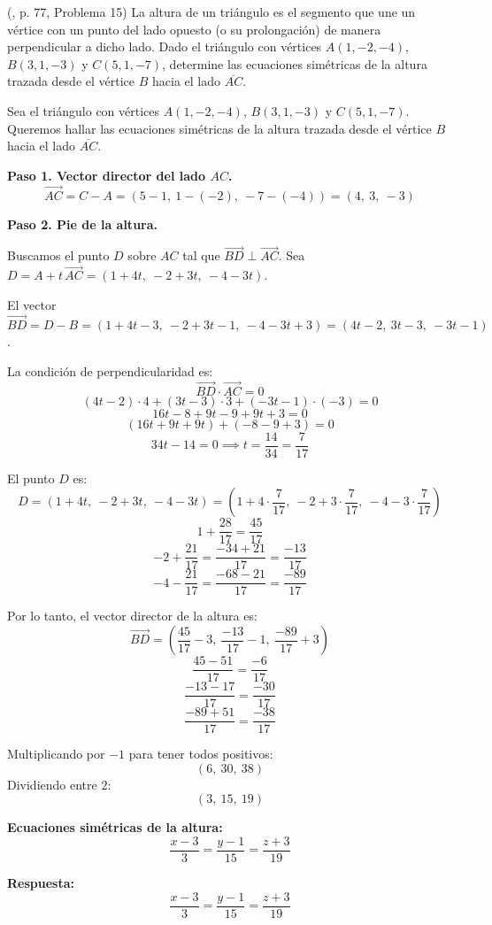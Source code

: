 \begin{prob} (\cite{espinoza2006Algebralineal}, p. 77, Problema 15) La altura de un triángulo es el segmento que une un vértice con un punto del lado opuesto (o su prolongación) de manera perpendicular a dicho lado. Dado el triángulo con vértices $A(1,-2,-4)$, $B(3,1,-3)$ y $C(5,1,-7)$, determine las ecuaciones simétricas de la altura trazada desde el vértice $B$ hacia el lado $\overline{AC}$. 
\begin{myproof}
Sea el triángulo con vértices $A(1,-2,-4)$, $B(3,1,-3)$ y $C(5,1,-7)$. Queremos hallar las ecuaciones simétricas de la altura trazada desde el vértice $B$ hacia el lado $\overline{AC}$.

\textbf{Paso 1. Vector director del lado $AC$.}
\[
\vec{AC} = C - A = (5-1,\ 1-(-2),\ -7-(-4)) = (4,\ 3,\ -3)
\]

\textbf{Paso 2. Pie de la altura.}

Buscamos el punto $D$ sobre $AC$ tal que $\overrightarrow{BD} \perp \overrightarrow{AC}$.
Sea $D = A + t\,\overrightarrow{AC} = (1 + 4t,\ -2 + 3t,\ -4 - 3t)$.

El vector $\overrightarrow{BD} = D - B = (1 + 4t - 3,\ -2 + 3t - 1,\ -4 - 3t + 3) = (4t - 2,\ 3t - 3,\ -3t - 1)$.

La condición de perpendicularidad es:
\[
\overrightarrow{BD} \cdot \overrightarrow{AC} = 0
\]
\[
(4t - 2) \cdot 4 + (3t - 3) \cdot 3 + (-3t - 1) \cdot (-3) = 0
\]
\[
16t - 8 + 9t - 9 + 9t + 3 = 0
\]
\[
(16t + 9t + 9t) + (-8 - 9 + 3) = 0
\]
\[
34t - 14 = 0 \implies t = \frac{14}{34} = \frac{7}{17}
\]

El punto $D$ es:
\[
D = (1 + 4t,\ -2 + 3t,\ -4 - 3t) = \left(1 + 4 \cdot \frac{7}{17},\ -2 + 3 \cdot \frac{7}{17},\ -4 - 3 \cdot \frac{7}{17}\right)
\]
\[
1 + \frac{28}{17} = \frac{45}{17}
\]
\[
-2 + \frac{21}{17} = \frac{-34 + 21}{17} = \frac{-13}{17}
\]
\[
-4 - \frac{21}{17} = \frac{-68 - 21}{17} = \frac{-89}{17}
\]

Por lo tanto, el vector director de la altura es:
\[
\overrightarrow{BD} = \left(\frac{45}{17} - 3,\ \frac{-13}{17} - 1,\ \frac{-89}{17} + 3\right)
\]
\[
\frac{45 - 51}{17} = \frac{-6}{17}
\]
\[
\frac{-13 - 17}{17} = \frac{-30}{17}
\]
\[
\frac{-89 + 51}{17} = \frac{-38}{17}
\]

Multiplicando por $-1$ para tener todos positivos:
\[
(6,\ 30,\ 38)
\]
Dividiendo entre $2$:
\[
(3,\ 15,\ 19)
\]

\textbf{Ecuaciones simétricas de la altura:}
\[
\frac{x - 3}{3} = \frac{y - 1}{15} = \frac{z + 3}{19}
\]

\textbf{Respuesta:}
\[
\boxed{
\frac{x - 3}{3} = \frac{y - 1}{15} = \frac{z + 3}{19}
}
\]
\end{myproof}

\end{prob}

